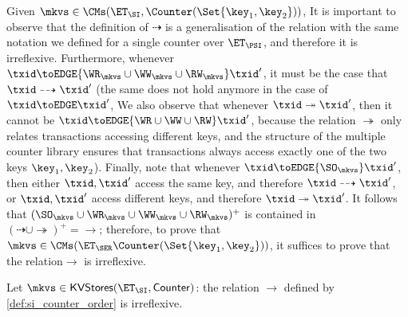 Given $\mkvs \in \CMs(\ET_{\SI}, \Counter(\Set{\key_1, \key_2}))$, 
It is important to observe that the definition of $\dashrightarrow$ is a generalisation of the relation 
with the same notation we defined for a single counter over $\ET_{\PSI}$, and therefore it is irreflexive. 
Furthermore, whenever $\txid \toEDGE{\WR_{\mkvs} \cup \WW_{\mkvs} \cup \RW_{\mkvs}} \txid'$, it must be the case that 
$\txid \dashrightarrow \txid'$ (the same does not hold anymore in the case of $\txid \toEDGE \txid'$, 
We also observe that whenever $\txid \twoheadrightarrow \txid'$, then it cannot be $\txid \toEDGE{\WR \cup \WW \cup \RW} \txid'$, 
because the relation $\twoheadrightarrow$ only relates transactions accessing different keys, and the structure of 
the multiple counter library ensures that transactions always access exactly one of the two keys $\key_1, \key_2$). 
Finally, note that whenever $\txid \toEDGE{\SO_{\mkvs}} \txid'$, then either $\txid, \txid'$ access the same 
key, and therefore $\txid \dashrightarrow \txid'$, or $\txid, \txid'$ access different keys, and therefore 
$\txid \twoheadrightarrow \txid'$. It follows that $(\SO_{\mkvs} \cup \WR_{\mkvs} \cup \WW_{\mkvs} \cup \RW_{\mkvs})^{+}$ 
is contained in $(\dashrightarrow \cup \twoheadrightarrow)^{+} = \rightarrow$; therefore, 
to prove that $\mkvs \in \CMs(\ET_{\SER}  \Counter(\Set{\key_1, \key_2}))$, it suffices to prove that 
the relation$\rightarrow$ is irreflexive.
%

\begin{proposition}
Let $\mkvs \in \mathsf{KVStores}(\ET_{\SI}, \mathsf{Counter})$: the relation $\rightarrow$ 
defined by \cref{def:si_counter_order} is irreflexive.
\end{proposition}

